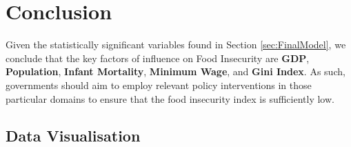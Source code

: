 \documentclass{article}
\begin{document}
\section{Conclusion}
Given the statistically significant variables found in Section \ref{sec:FinalModel}, we conclude that the key factors of influence on Food Insecurity are \textbf{GDP}, \textbf{Population}, \textbf{Infant Mortality}, \textbf{Minimum Wage}, and \textbf{Gini Index}. As such, governments should aim to employ relevant policy interventions in those particular domains to ensure that the food insecurity index is sufficiently low. 

\newpage
\clearpage
{}
\begin{appendices}

\section{Data Visualisation}


\end{appendices}
\end{document}
